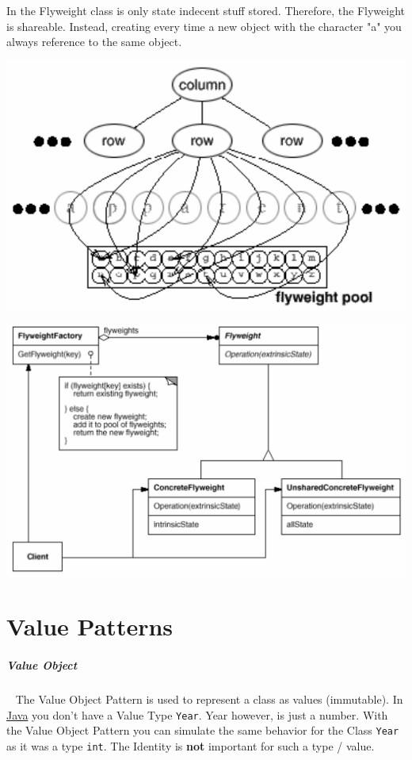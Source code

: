 \documentclass[11pt,twoside,landscape]{article}
\begin{document}
\begin{multicols}{3}
In the Flyweight class is only state indecent stuff stored.
Therefore, the Flyweight is shareable.
Instead, creating every time a new object with the character "a" you always reference to the same object.


{
\begin{center}
\includegraphics[width=.9\linewidth]{img/flyweight_example.png}
\end{center}
\label{fig:flyweight-example}
}

{
\begin{center}
\includegraphics[width=.9\linewidth]{img/flyweight.png}
\end{center}
\label{fig:flyweight-class-diagram}
}
\section{Value Patterns}
\label{sec:orgdbdca7d}
\subparagraph{Value Object} \
\label{sec:org1a8bebf}
The Value Object Pattern is used to represent a class as values (immutable).
In \href{../../../roam/20201116150053-java.org}{Java} you don't have a Value Type \texttt{Year}.
Year however, is just a number.
With the Value Object Pattern you can simulate the same behavior for the Class \texttt{Year} as it was a type \texttt{int}.
The Identity is \textbf{not} important for such a type / value.



\end{multicols}
\end{document}
